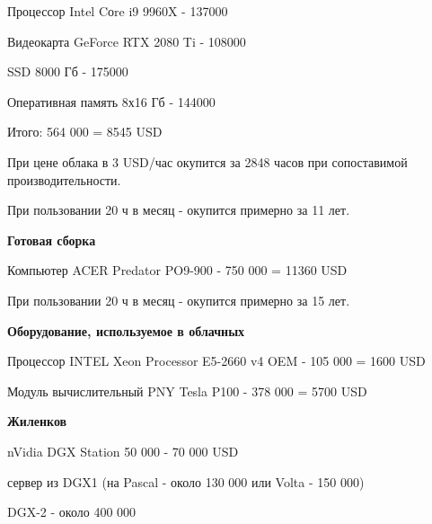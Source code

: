 Процессор Intel Cоre i9 9960X - 137000

Видеокарта  GeForce RTX 2080 Ti - 108000

SSD 8000 Гб - 175000

Оперативная память 8х16 Гб - 144000

Итого: 564 000 = 8545 USD

При цене облака в 3 USD/час окупится за 2848 часов при сопоставимой производительности.

При пользовании 20 ч в месяц - окупится примерно за 11 лет.

\textbf{Готовая сборка} 

Компьютер ACER Predator PO9-900 - 750 000 = 11360 USD

При пользовании 20 ч в месяц - окупится примерно за 15 лет.

\textbf{Оборудование, используемое в облачных}

Процессор INTEL Xeon Processor E5-2660 v4 OEM - 105 000 = 1600 USD

Модуль вычислительный PNY Tesla P100 - 378 000 = 5700 USD


\textbf{Жиленков}

nVidia DGX Station 50 000 - 70 000 USD

сервер из DGX1 (на Pascal - около 130 000 или Volta - 150 000)  

DGX-2 - около 400 000
